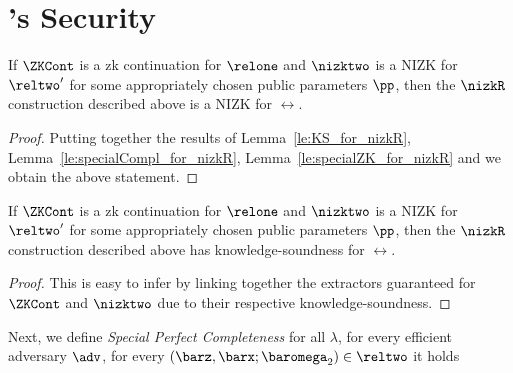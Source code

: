 
\section{\nizkR's Security}
\label{ap:nizkR}
\begin{theorem}
	If $\ZKCont$ is a zk continuation for $\relone$ and $\nizktwo$ is a NIZK for $\reltwo'$ for some appropriately chosen public parameters $\pp$, 
	then the $\nizkR$ construction described above is a NIZK for $\rel$.
\end{theorem}
\begin{proof} Putting together the results of Lemma~\ref{le:KS_for_nizkR}, Lemma~\ref{le:specialCompl_for_nizkR}, 
	Lemma~\ref{le:specialZK_for_nizkR} and  we obtain the above statement.
\end{proof} 
\begin{lemma} 
	\label{le:KS_for_nizkR}
	If $\ZKCont$ is a zk continuation for $\relone$ and $\nizktwo$ is a NIZK for $\reltwo'$ for some appropriately chosen public parameters $\pp$, 
	then the $\nizkR$ construction described above has knowledge-soundness for $\rel$. 
\end{lemma} 
\begin{proof}This is easy to infer by linking together the extractors guaranteed for $\ZKCont$ and $\nizktwo$ due to their respective 
	knowledge-soundness.
\end{proof}
\noindent Next, we define 
\emph{Special Perfect Completeness} for all $\lambda $, for every efficient adversary $\adv$, for every 
$(\barz, \barx; \baromega_2) \in \reltwo$ it holds
